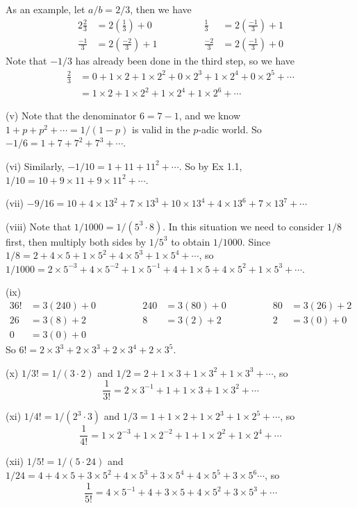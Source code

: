 \documentclass[../Koblitz.tex]{subfiles}
\begin{document}
As an example, let $a/b=2/3$, then we have
\begin{alignat*}{2}
\frac{2}{3}&=2\left(\frac{1}{3}\right)+0 &\qquad\qquad \frac{1}{3}&=2\left(\frac{-1}{3}\right)+1 \\
\frac{-1}{3}&=2\left(\frac{-2}{3}\right)+1 &\qquad\qquad
\frac{-2}{3}&=2\left(\frac{-1}{3}\right)+0
\end{alignat*}
Note that $-1/3$ has already been done in the third step, so we have \begin{align*}
\frac{2}{3} &= 0+1\times2+1\times2^2+0\times2^3+1\times2^4+0\times2^5+\cdots \\
&= 1\times2+1\times2^2+1\times2^4+1\times2^6+\cdots
\end{align*}

(v) Note that the denominator $6=7-1$, and we know $1+p+p^2+\cdots=1/(1-p)$ is valid in the $p$-adic world. So $-1/6=1+7+7^2+7^3+\cdots$.

(vi) Similarly, $-1/10=1+11+11^2+\cdots$. So by Ex 1.1, $1/10=10+9\times11+9\times11^2+\cdots$.

(vii) $-9/16=10+4\times13^2+7\times13^3+10\times13^4+4\times13^6+7\times13^7+\cdots$

(viii) Note that $1/1000=1/(5^3\cdot8)$. In this situation we need to consider $1/8$ first, then multiply both sides by $1/5^3$ to obtain $1/1000$. Since $1/8=2+4\times5+1\times5^2+4\times5^3+1\times5^4+\cdots$, so $1/1000=2\times5^{-3}+4\times5^{-2}+1\times5^{-1}+4+1\times5+4\times5^2+1\times5^3+\cdots$.

(ix) \begin{alignat*}{3}
6!&=3(240)+0 &\qquad\qquad 240&=3(80)+0 &\qquad\qquad 80&=3(26)+2 \\
26&=3(8)+2 &\qquad \qquad 8&=3(2)+2 &\qquad\qquad 2&=3(0)+0 \\
0&=3(0)+0
\end{alignat*}
So $6!=2\times3^3+2\times3^3+2\times3^4+2\times3^5$.

(x) $1/3!=1/(3\cdot2)$ and $1/2=2+1\times3+1\times3^2+1\times3^3+\cdots$, so $$\frac{1}{3!}=2\times3^{-1}+1+1\times3+1\times3^2+\cdots$$

(xi) $1/4!=1/(2^3\cdot3)$ and $1/3=1+1\times2+1\times2^3+1\times2^5+\cdots$, so $$\frac{1}{4!}=1\times2^{-3}+1\times2^{-2}+1+1\times2^2+1\times2^4+\cdots$$

(xii) $1/5!=1/(5\cdot24)$ and $1/24=4+4\times5+3\times5^2+4\times5^3+3\times5^4+4\times5^5+3\times5^6\cdots$, so $$\frac{1}{5!}=4\times5^{-1}+4+3\times5+4\times5^2+3\times5^3+\cdots$$
\end{document}
